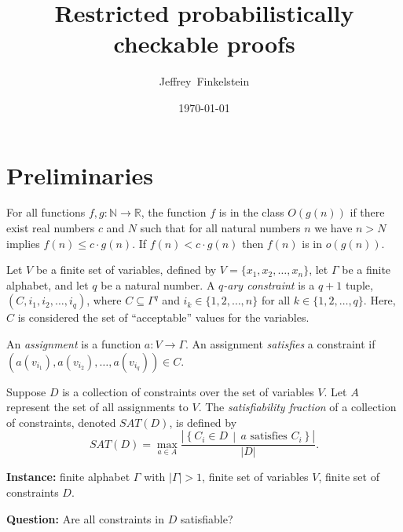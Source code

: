 \documentclass[]{article}
\title{Restricted probabilistically checkable proofs}
\author{Jef{}frey~Finkelstein}
\date{\today}
\begin{document}
\maketitle

\section{Preliminaries}

\begin{definition}
  For all functions $f, g \colon \mathbb{N} \to \mathbb{R}$, the function $f$ is in the class $O(g(n))$ if there exist real numbers $c$ and $N$ such that for all natural numbers $n$ we have $n > N$ implies $f(n) \leq c \cdot g(n)$.
  If $f(n) < c \cdot g(n)$ then $f(n)$ is in $o(g(n))$.
\end{definition}

\begin{definition}
  Let $V$ be a finite set of variables, defined by $V = \{x_1, x_2, \dotsc, x_n\}$, let $\Gamma$ be a finite alphabet, and let $q$ be a natural number.
  A \emph{$q$-ary constraint} is a $q + 1$ tuple, $(C, i_1, i_2, \dotsc, i_q)$, where $C \subseteq \Gamma^q$ and $i_k \in \{1, 2, \dotsc, n\}$ for all $k \in \{1, 2, \ldots, q\}$.
  Here, $C$ is considered the set of ``acceptable'' values for the variables.

  An \emph{assignment} is a function $a \colon V \to \Gamma$.
  An assignment \emph{satisfies} a constraint if $(a(v_{i_1}), a(v_{i_2}), \dotsc, a(v_{i_q})) \in C$.
\end{definition}

\begin{definition}
  Suppose $D$ is a collection of constraints over the set of variables $V$.
  Let $A$ represent the set of all assignments to $V$.
  The \emph{satisfiability fraction} of a collection of constraints, denoted $SAT(D)$, is defined by
  \begin{equation*}
    SAT(D) = \max_{a \in A}{\frac{\left|\left\{ C_i \in D \, \middle| \, a \text{ satisfies } C_i \right\}\right|}{\left|D\right|}}.
  \end{equation*}
\end{definition}

\begin{definition}
  \mbox{}

  \textbf{Instance:} finite alphabet $\Gamma$ with $|\Gamma| > 1$, finite set of variables $V$, finite set of constraints $D$.

  \textbf{Question:} Are all constraints in $D$ satisfiable?
\end{definition}
\end{document}
